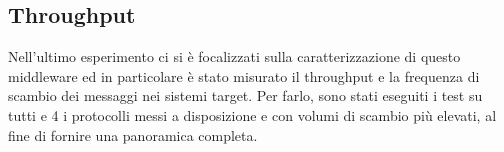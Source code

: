 \subsection{Throughput}
Nell'ultimo esperimento ci si è focalizzati sulla caratterizzazione di questo middleware ed in particolare è stato misurato il throughput e la frequenza di scambio dei messaggi nei sistemi target. 
Per farlo, sono stati eseguiti i test su tutti e 4 i protocolli messi a disposizione e con volumi di scambio più elevati, al fine di fornire una panoramica completa. %

    
